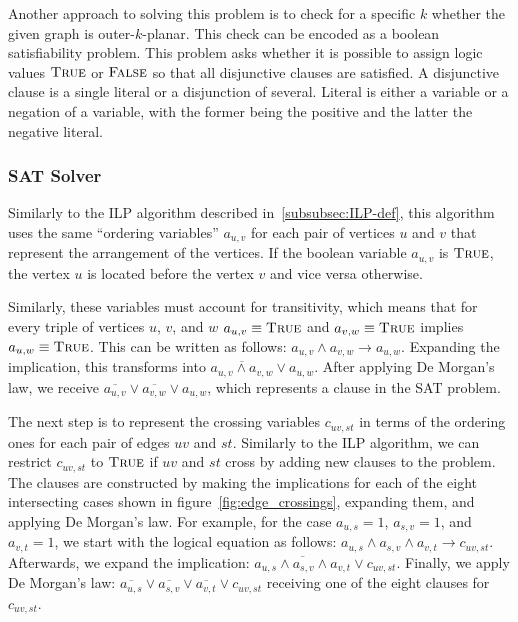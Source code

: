 \documentclass{article}
\begin{document}
    Another approach to solving this problem is to check for a specific $k$ whether the given graph is outer-$k$-planar.
    This check can be encoded as a boolean satisfiability problem.
    This problem asks whether it is possible to assign logic values $\textsc{True}$ or $\textsc{False}$ so that all disjunctive clauses are satisfied.
    A disjunctive clause is a single literal or a disjunction of several.
    Literal is either a variable or a negation of a variable, with the former being the positive and the latter the negative literal.

    \subsubsection{SAT Solver}

    Similarly to the ILP algorithm described in~\ref{subsubsec:ILP-def}, this algorithm uses the same ``ordering variables'' $a_{u, v}$ for each pair of vertices $u$ and $v$ that represent the arrangement of the vertices.
    If the boolean variable $a_{u, v}$ is $\textsc{True}$, the vertex $u$ is located before the vertex $v$ and vice versa otherwise.

    Similarly, these variables must account for transitivity, which means that for every triple of vertices $u$, $v$, and $w$ $a_{u, v} \equiv \textsc{True}$ and $a_{v, w} \equiv \textsc{True}$ implies $a_{u, w} \equiv \textsc{True}$.
    This can be written as follows: $a_{u, v} \land a_{v, w} \rightarrow a_{u, w}$.
    Expanding the implication, this transforms into $\overline{a_{u, v} \land a_{v, w}} \lor a_{u, w}$.
    After applying De Morgan's law, we receive $\overline{a_{u, v}} \lor \overline{a_{v, w}} \lor a_{u, w}$, which represents a clause in the SAT problem.

    The next step is to represent the crossing variables $c_{uv, st}$ in terms of the ordering ones for each pair of edges $uv$ and $st$.
    Similarly to the ILP algorithm, we can restrict $c_{uv, st}$ to $\textsc{True}$ if $uv$ and $st$ cross by adding new clauses to the problem.
    The clauses are constructed by making the implications for each of the eight intersecting cases shown in figure~\ref{fig:edge_crossings}, expanding them, and applying De Morgan's law.
    For example, for the case $a_{u,s} = 1$, $a_{s,v} = 1$, and $a_{v,t} = 1$, we start with the logical equation as follows: $a_{u,s} \land a_{s,v} \land a_{v,t} \rightarrow c_{uv, st}$.
    Afterwards, we expand the implication: $\overline{a_{u,s} \land a_{s,v} \land a_{v,t}} \lor c_{uv, st}$.
    Finally, we apply De Morgan's law: $\overline{a_{u,s}} \lor \overline{a_{s,v}} \lor \overline{a_{v,t}} \lor c_{uv, st}$ receiving one of the eight clauses for $c_{uv, st}$.
\end{document}

